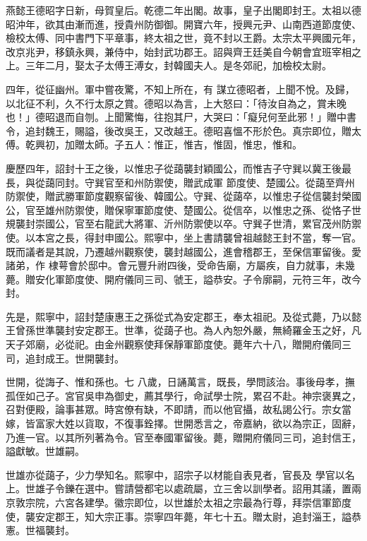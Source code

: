 \begin{pinyinscope}
 燕懿王德昭字日新，母賀皇后。乾德二年出閣。故事，皇子出閣即封王。太祖以德昭沖年，欲其由漸而進，授貴州防御御。開寶六年，授興元尹、山南西道節度使、檢校太傅、同中書門下平章事，終太祖之世，竟不封以王爵。太宗太平興國元年，改京兆尹，移鎮永興，兼侍中，始封武功郡王。詔與齊王廷美自今朝會宜班宰相之上。三年二月，娶太子太傅王溥女，封韓國夫人。是冬郊祀，加檢校太尉。



 四年，從征幽州。軍中嘗夜驚，不知上所在，有
 謀立德昭者，上聞不悅。及歸，以北征不利，久不行太原之賞。德昭以為言，上大怒曰：「待汝自為之，賞未晚也！」德昭退而自刎。上聞驚悔，往抱其尸，大哭曰：「癡兒何至此邪！」贈中書令，追封魏王，賜謚，後改吳王，又改越王。德昭喜慍不形於色。真宗即位，贈太傅。乾興初，加贈太師。子五人：惟正，惟吉，惟固，惟忠，惟和。



 慶歷四年，詔封十王之後，以惟忠子從藹襲封穎國公，而惟吉子守巽以冀王後最長，與從藹同封。守巽官至和州防禦使，贈武成軍
 節度使、楚國公。從藹至齊州防禦使，贈武勝軍節度觀察留後、韓國公。守巽、從藹卒，以惟忠子從信襲封榮國公，官至雄州防禦使，贈保寧軍節度使、楚國公。從信卒，以惟忠之孫、從恪子世規襲封崇國公，官至右龍武大將軍、沂州防禦使以卒。守巽子世清，累官茂州防禦使。以本宮之長，得封申國公。熙寧中，坐上書請襲曾祖越懿王封不當，奪一官。既而議者是其說，乃遷越州觀察使，襲封越國公，進會稽郡王，至保信軍留後。愛諸弟，作
 棣萼會於邸中。會元豐升祔四後，受命告廟，方屬疾，自力就事，未幾薨。贈安化軍節度使、開府儀同三司、虢王，謚恭安。子令廓嗣，元符三年，改今封。



 先是，熙寧中，詔封楚康惠王之孫從式為安定郡王，奉太祖祀。及從式薨，乃以懿王曾孫世準襲封安定郡王。世準，從藹子也。為人內恕外嚴，無綺羅金玉之好，凡天子郊廟，必從祀。由金州觀察使拜保靜軍節度使。薨年六十八，贈開府儀同三司，追封成王。世開襲封。



 世開，從誨子、惟和孫也。七
 八歲，日誦萬言，既長，學問該治。事後母孝，撫孤侄如己子。宮官吳申為御史，薦其學行，命試學士院，累召不赴。神宗褒異之，召對便殿，論事甚眾。時宮僚有缺，不即請，而以他官攝，故私謁公行。宗女當嫁，皆富家大姓以貨取，不復事銓擇。世開悉言之，帝嘉納，欲以為宗正，固辭，乃進一官。以其所列著為令。官至奉國軍留後。薨，贈開府儀同三司，追封信王，謚獻敏。世雄嗣。



 世雄亦從藹子，少力學知名。熙寧中，詔宗子以材能自表見者，官長及
 學官以名上。世雄子令鑠在選中。嘗請營都宅以處疏屬，立三舍以訓學者。詔用其議，置兩京敦宗院，六宮各建學。徽宗即位，以世雄於太祖之宗最為行尊，拜崇信軍節度使，襲安定郡王，知大宗正事。崇寧四年薨，年七十五。贈太尉，追封淄王，謚恭憲。世福襲封。




\end{pinyinscope}
